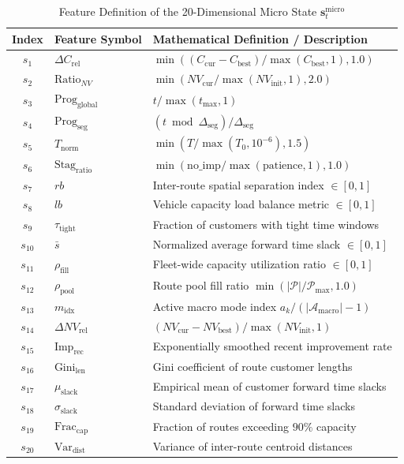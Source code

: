 \documentclass{ieeeaccess}
\begin{document}
\begin{table}[!t]
\caption{Feature Definition of the 20-Dimensional Micro State $\mathbf{s}_t^{\text{micro}}$}
\label{tab:micro_state}
\centering
\footnotesize
\begin{tabularx}{\columnwidth}{c l X}
\toprule
\textbf{Index} & \textbf{Feature Symbol} & \textbf{Mathematical Definition / Description} \\
\midrule
$s_1$ & $\Delta C_{\text{rel}}$ & $\min((C_{\text{cur}} - C_{\text{best}})/\max(C_{\text{best}}, 1), 1.0)$ \\
$s_2$ & $\text{Ratio}_{NV}$ & $\min(NV_{\text{cur}}/\max(NV_{\text{init}}, 1), 2.0)$ \\
$s_3$ & $\text{Prog}_{\text{global}}$ & $t / \max(t_{\max}, 1)$ \\
$s_4$ & $\text{Prog}_{\text{seg}}$ & $(t \bmod \Delta_{\text{seg}}) / \Delta_{\text{seg}}$ \\
$s_5$ & $T_{\text{norm}}$ & $\min(T / \max(T_0, 10^{-6}), 1.5)$ \\
$s_6$ & $\text{Stag}_{\text{ratio}}$ & $\min(\text{no\_imp} / \max(\text{patience}, 1), 1.0)$ \\
$s_7$ & $rb$ & Inter-route spatial separation index $\in [0, 1]$ \\
$s_8$ & $lb$ & Vehicle capacity load balance metric $\in [0, 1]$ \\
$s_9$ & $\tau_{\text{tight}}$ & Fraction of customers with tight time windows \\
$s_{10}$ & $\bar{s}$ & Normalized average forward time slack $\in [0, 1]$ \\
$s_{11}$ & $\rho_{\text{fill}}$ & Fleet-wide capacity utilization ratio $\in [0, 1]$ \\
$s_{12}$ & $\rho_{\text{pool}}$ & Route pool fill ratio $\min(|\mathcal{P}|/\mathcal{P}_{\max}, 1.0)$ \\
$s_{13}$ & $m_{\text{idx}}$ & Active macro mode index $a_k / (|\mathcal{A}_{\text{macro}}| - 1)$ \\
$s_{14}$ & $\Delta NV_{\text{rel}}$ & $(NV_{\text{cur}} - NV_{\text{best}}) / \max(NV_{\text{init}}, 1)$ \\
$s_{15}$ & $\text{Imp}_{\text{rec}}$ & Exponentially smoothed recent improvement rate \\
$s_{16}$ & $\text{Gini}_{\text{len}}$ & Gini coefficient of route customer lengths \\
$s_{17}$ & $\mu_{\text{slack}}$ & Empirical mean of customer forward time slacks \\
$s_{18}$ & $\sigma_{\text{slack}}$ & Standard deviation of forward time slacks \\
$s_{19}$ & $\text{Frac}_{\text{cap}}$ & Fraction of routes exceeding $90\%$ capacity \\
$s_{20}$ & $\text{Var}_{\text{dist}}$ & Variance of inter-route centroid distances \\
\bottomrule
\end{tabularx}
\end{table}
\end{document}
